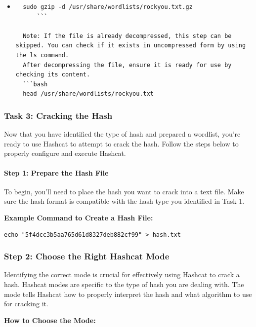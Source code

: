 \documentclass[11pt,a4paper]{article}
\begin{document}
\begin{itemize}
\item
\begin{verbatim}
  sudo gzip -d /usr/share/wordlists/rockyou.txt.gz
      ```

  Note: If the file is already decompressed, this step can be skipped. You can check if it exists in uncompressed form by using the ls command.
  After decompressing the file, ensure it is ready for use by checking its content.
  ```bash
  head /usr/share/wordlists/rockyou.txt
\end{verbatim}
\end{itemize}

\subsubsection{Task 3: Cracking the
Hash}\label{task-3-cracking-the-hash}

Now that you have identified the type of hash and prepared a wordlist,
you're ready to use Hashcat to attempt to crack the hash. Follow the
steps below to properly configure and execute Hashcat.

\paragraph{Step 1: Prepare the Hash
File}\label{step-1-prepare-the-hash-file}

To begin, you'll need to place the hash you want to crack into a text
file. Make sure the hash format is compatible with the hash type you
identified in Task 1.

\textbf{Example Command to Create a Hash File:}

\begin{verbatim}
echo "5f4dcc3b5aa765d61d8327deb882cf99" > hash.txt
\end{verbatim}

\subsubsection{Step 2: Choose the Right Hashcat
Mode}\label{step-2-choose-the-right-hashcat-mode}

Identifying the correct mode is crucial for effectively using Hashcat to
crack a hash. Hashcat modes are specific to the type of hash you are
dealing with. The mode tells Hashcat how to properly interpret the hash
and what algorithm to use for cracking it.

\textbf{How to Choose the Mode:}
\end{document}
